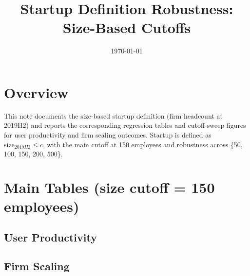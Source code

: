 \documentclass[11pt]{article}
\title{Startup Definition Robustness: Size-Based Cutoffs}
\date{\today}
\begin{document}
\maketitle
\onehalfspacing

\section*{Overview}
This note documents the size-based startup definition (firm headcount at 2019H2) and reports the corresponding regression tables and cutoff-sweep figures for user productivity and firm scaling outcomes. Startup is defined as $\text{size}_{2019H2} \leq c$, with the main cutoff at 150 employees and robustness across \{50, 100, 150, 200, 500\}.

\section*{Main Tables (size cutoff = 150 employees)}

\subsection*{User Productivity}



\subsection*{Firm Scaling}



\end{document}
